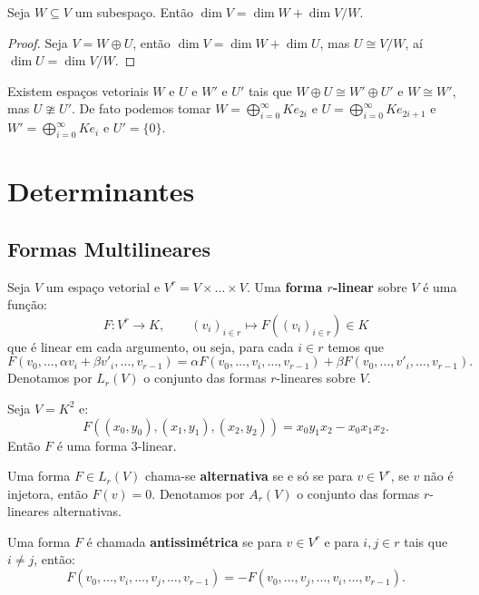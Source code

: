 \documentclass[11pt,twoside,a4paper]{book}
\begin{document}
\begin{corolario}
Seja $W\subseteq V$ um subespaço. Então $\dim V=\dim W+\dim V/W$.
\end{corolario}
\begin{proof}
Seja $V=W\oplus U$, então $\dim V=\dim W+\dim U$, mas $U\cong V/W$, aí $\dim U=\dim V/W$.
\end{proof}

\begin{observacao}
Existem espaços vetoriais $W$ e $U$ e $W'$ e $U'$ tais que $W\oplus U\cong W'\oplus U'$ e $W\cong W'$, mas $U\ncong U'$. De fato podemos tomar $W=\bigoplus_{i=0}^\infty Ke_{2i}$ e $U=\bigoplus_{i=0}^\infty Ke_{2i+1}$ e $W'=\bigoplus_{i=0}^\infty Ke_i$ e $U'=\{0\}$.
\end{observacao}

\chapter{Determinantes}

\section{Formas Multilineares}

\begin{definicao}
Seja $V$ um espaço vetorial e $V^r=V\times\dots\times V$. Uma \textbf{forma $r$-linear} sobre $V$ é uma função:
\[
F:V^r\rightarrow K,\quad\quad (v_i)_{i\in r}\mapsto F((v_i)_{i\in r})\in K
\]
que é linear em cada argumento, ou seja, para cada $i\in r$ temos que
\[
F(v_0,\dots,\alpha v_i+\beta v'_i,\dots,v_{r-1})=\alpha F(v_0,\dots,v_i,\dots,v_{r-1})+\beta F(v_0,\dots,v'_i,\dots,v_{r-1}).
\]
Denotamos por $L_r(V)$ o conjunto das formas $r$-lineares sobre $V$.
\end{definicao}

\begin{exemplo}
Seja $V=K^2$ e:
\[
F((x_0,y_0),(x_1,y_1),(x_2,y_2))=x_0y_1x_2-x_0x_1x_2.
\]
Então $F$ é uma forma 3-linear.
\end{exemplo}

\begin{definicao}
Uma forma $F\in L_r(V)$ chama-se \textbf{alternativa} se e só se para $v\in V^r$, se $v$ não é injetora, então $F(v)=0$. Denotamos por $A_r(V)$ o conjunto das formas $r$-lineares alternativas.
\end{definicao}

\begin{definicao}
Uma forma $F$ é chamada \textbf{antissimétrica} se para $v\in V^r$ e para $i,j\in r$ tais que $i\neq j$, então:
\[
F(v_0,\dots,v_i,\dots,v_j,\dots,v_{r-1})=-F(v_0,\dots,v_j,\dots,v_i,\dots,v_{r-1}).
\]
\end{definicao}
\end{document}
